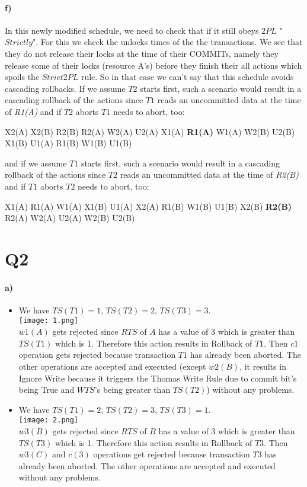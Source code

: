 \documentclass[a4paper,12pt]{article}
\begin{document}
\paragraph{f)} In this newly modified schedule, we need to check that if it still obeys $2PL$ "$Strictly$". For this we check the unlocks times of the the transactions. We see that they do not release their locks at the time of their COMMITs, namely they release some of their locks (resource A's) before they finish their all actions which spoils the $Strict 2PL$ rule. So in that case we can't say that this schedule avoids cascading rollbacks. If we assume $T2$ starts first, such a scenario would result in a cascading rollback of the actions since $T1$ reads an uncommitted data at the time of \textit{R1(A)} and if $T2$ aborts $T1$ needs to abort, too: \\
\begin{center}
X2(A) X2(B) R2(B) R2(A) W2(A) U2(A) X1(A) \textbf{R1(A)} W1(A) W2(B) U2(B) X1(B) U1(A) R1(B) W1(B) U1(B)
\end{center}
and if we assume $T1$ starts first, such a scenario would result in a cascading rollback of the actions since $T2$ reads an uncommitted data at the time of \textit{R2(B)} and if $T1$ aborts $T2$ needs to abort, too: \\
\begin{center}
X1(A) R1(A) W1(A) X1(B) U1(A) X2(A) R1(B) W1(B) U1(B) X2(B) \textbf{R2(B)} R2(A) W2(A) U2(A) W2(B) U2(B)    
\end{center}
\newpage
\section{Q2}

\paragraph{a)} 

\begin{itemize}
    \item We have $TS(T1)=1$, $TS(T2)=2$, $TS(T3)=3$. \\
    \texttt{[image: 1.png]} \\
    $w1(A)$ gets rejected since $RTS$ of $A$ has a value of 3 which is greater than $TS(T1)$ which is 1. Therefore this action results in Rollback of $T1$. Then $c1$ operation gets rejected because transaction $T1$ has already been aborted. The other operations are accepted and executed (except $w2(B)$, it results in Ignore Write because it triggers the Thomas Write Rule due to commit bit’s being True and $WTS$’s being greater than $TS(T2)$) without any problems.
    \newpage
    \item We have $TS(T1)=2$, $TS(T2)=3$, $TS(T3)=1$. \\
    \texttt{[image: 2.png]} \\
    $w3(B)$ gets rejected since $RTS$ of $B$ has a value of 3 which is greater than $TS(T3)$ which is 1. Therefore this action results in Rollback of $T3$. Then $w3(C)$ and $c(3)$ operations get rejected because transaction $T3$ has already been aborted. The other operations are accepted and executed without any problems.
\end{itemize}
\end{document}

